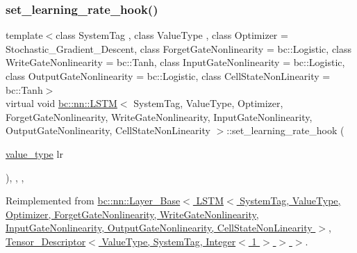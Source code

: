 \subsubsection{\texorpdfstring{set\+\_\+learning\+\_\+rate\+\_\+hook()}{set\_learning\_rate\_hook()}}
{\footnotesize\ttfamily template$<$class System\+Tag , class Value\+Type , class Optimizer  = Stochastic\+\_\+\+Gradient\+\_\+\+Descent, class Forget\+Gate\+Nonlinearity  = bc\+::\+Logistic, class Write\+Gate\+Nonlinearity  = bc\+::\+Tanh, class Input\+Gate\+Nonlinearity  = bc\+::\+Logistic, class Output\+Gate\+Nonlinearity  = bc\+::\+Logistic, class Cell\+State\+Non\+Linearity  = bc\+::\+Tanh$>$ \\
virtual void \hyperlink{structbc_1_1nn_1_1LSTM}{bc\+::nn\+::\+L\+S\+TM}$<$ System\+Tag, Value\+Type, Optimizer, Forget\+Gate\+Nonlinearity, Write\+Gate\+Nonlinearity, Input\+Gate\+Nonlinearity, Output\+Gate\+Nonlinearity, Cell\+State\+Non\+Linearity $>$\+::set\+\_\+learning\+\_\+rate\+\_\+hook (\begin{DoxyParamCaption}\item[{\hyperlink{structbc_1_1nn_1_1LSTM_a4f4948a22b62ff7975968bb2d38e79a2}{value\+\_\+type}}]{lr }\end{DoxyParamCaption})\hspace{0.3cm}{\ttfamily [inline]}, {\ttfamily [final]}, {\ttfamily [override]}, {\ttfamily [virtual]}}



Reimplemented from \hyperlink{structbc_1_1nn_1_1Layer__Base_a126da3cf45e1b4a24deeff82c93772ce}{bc\+::nn\+::\+Layer\+\_\+\+Base$<$ L\+S\+T\+M$<$ System\+Tag, Value\+Type, Optimizer, Forget\+Gate\+Nonlinearity, Write\+Gate\+Nonlinearity, Input\+Gate\+Nonlinearity, Output\+Gate\+Nonlinearity, Cell\+State\+Non\+Linearity $>$, Tensor\+\_\+\+Descriptor$<$ Value\+Type, System\+Tag, Integer$<$ 1 $>$ $>$ $>$}.

\mbox{\label{structbc_1_1nn_1_1LSTM_a98237c18f037ecedd25581a11433a476}} 
